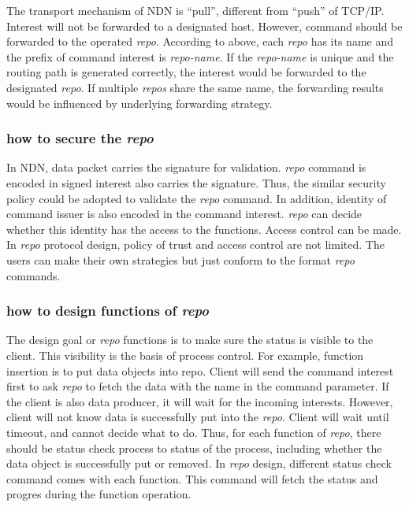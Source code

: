 \documentclass[conference]{IEEEtran}
\begin{document}
The transport mechanism of NDN is ``pull'', different from ``push'' of TCP/IP. Interest will not be forwarded to a designated host. However, command should be forwarded to the operated \emph{repo}. According to above, each \emph{repo} has its name and the prefix of command interest is \emph{repo-name}. If the \emph{repo-name} is unique and the routing path is generated correctly, the interest would be forwarded to the designated \emph{repo}. If multiple \emph{repos} share the same name, the forwarding results would be influenced by underlying forwarding strategy.

\subsubsection{how to secure the \emph{repo}}

In NDN, data packet carries the signature for validation. \emph{repo} command is encoded in signed interest also carries the signature. Thus, the similar security policy could be adopted to validate the \emph{repo} command. In addition, identity of command issuer is also encoded in the command interest. \emph{repo} can decide whether this identity has the access to the functions. Access control can be made. In \emph{repo} protocol design, policy of trust and access control are not limited. The users can make their own strategies but just conform to the format \emph{repo} commands.

\subsubsection{how to design functions of \emph{repo}}

The design goal or \emph{repo} functions is to make sure the status is visible to the client. This visibility is the basis of process control. For example, function insertion is to put data objects into repo. Client will send the command interest first to ask \emph{repo} to fetch the data with the name in the command parameter. If the client is also data producer, it will wait for the incoming interests. However, client will not know data is successfully put into the \emph{repo}. Client will wait until timeout, and cannot decide what to do. Thus, for each function of \emph{repo}, there should be status check process to status of the process, including whether the data object is successfully put or removed. In \emph{repo} design, different status check command comes with each function. This command will fetch the status and progres during the function operation.
\end{document}
